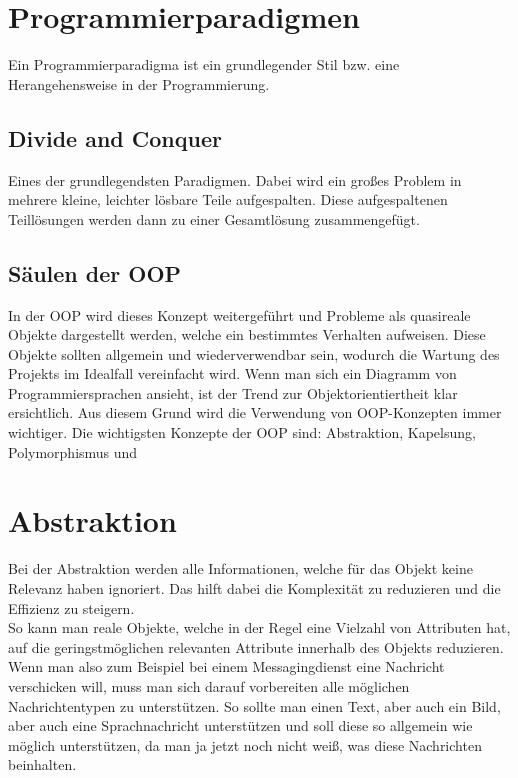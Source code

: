 \documentclass{article}
\begin{document}
	\section{Programmierparadigmen}
	Ein Programmierparadigma ist ein grundlegender Stil bzw. eine Herangehensweise in der Programmierung.
	\subsection{Divide and Conquer}
	Eines der grundlegendsten Paradigmen. Dabei wird ein großes Problem in mehrere kleine, leichter lösbare Teile aufgespalten. Diese aufgespaltenen Teillösungen werden dann zu einer Gesamtlösung zusammengefügt.
	\subsection{Säulen der OOP}
	In der OOP wird dieses Konzept weitergeführt und Probleme als quasireale Objekte dargestellt werden, welche ein bestimmtes Verhalten aufweisen. Diese Objekte sollten allgemein und wiederverwendbar sein, wodurch die Wartung des Projekts im Idealfall vereinfacht wird. Wenn man sich ein Diagramm von Programmiersprachen ansieht, ist der Trend zur Objektorientiertheit klar ersichtlich. Aus diesem Grund wird die Verwendung von OOP-Konzepten immer wichtiger. Die wichtigsten Konzepte der OOP sind: Abstraktion, Kapelsung, Polymorphismus und
	\section{Abstraktion}
	Bei der Abstraktion werden alle Informationen, welche für das Objekt keine Relevanz haben ignoriert. Das hilft dabei die Komplexität zu reduzieren und die Effizienz zu steigern. \\
	So kann man reale Objekte, welche in der Regel eine Vielzahl von Attributen hat, auf die geringstmöglichen relevanten Attribute innerhalb des Objekts reduzieren. 
	Wenn man also zum Beispiel bei einem Messagingdienst eine Nachricht verschicken will, muss man sich darauf vorbereiten alle möglichen Nachrichtentypen zu unterstützen. So sollte man einen Text, aber auch ein Bild, aber auch eine Sprachnachricht unterstützen und soll diese so allgemein wie möglich unterstützen, da man ja jetzt noch nicht weiß, was diese Nachrichten beinhalten.
\end{document}
